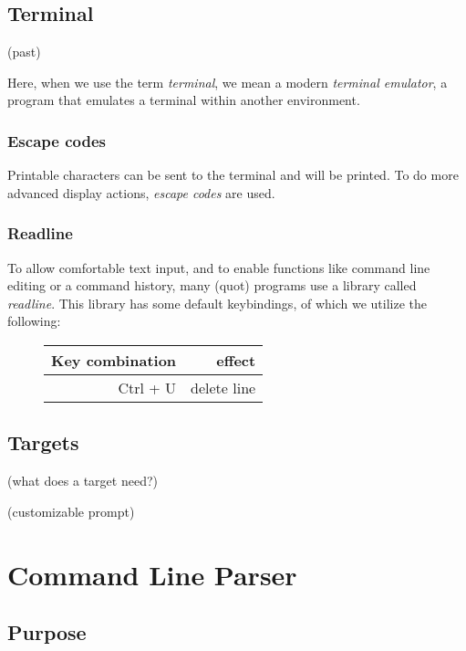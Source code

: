 \documentclass[twoside]{scrreprt}
\begin{document}
\section{Terminal}

(past)

Here, when we use the term \emph{terminal}, we mean a modern \emph{terminal emulator}, a program that emulates a terminal within another environment.

\subsection{Escape codes}

Printable characters can be sent to the terminal and will be printed. To do more advanced display actions, \emph{escape codes} are used.

\subsection{Readline}

To allow comfortable text input, and to enable functions like command line editing or a command history, many (quot) programs use a library called \emph{readline}. This library has some default keybindings, of which we utilize the following:

\begin{figure}
    \begin{tabular}{r|r}
        Key combination & effect \\
        \hline
        Ctrl + U & delete line \\
    \end{tabular}
\end{figure}

\section{Targets}

(what does a target need?)

(customizable prompt)

\chapter{Command Line Parser}

\section{Purpose}
\end{document}
